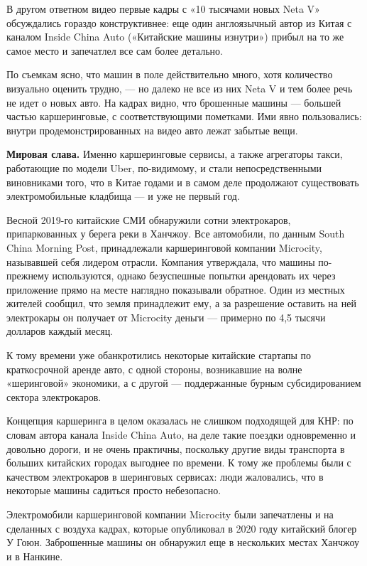 В другом ответном видео первые кадры с «10 тысячами новых Neta V» обсуждались гораздо конструктивнее: еще один англоязычный автор из Китая с каналом Inside China Auto («Китайские машины изнутри») прибыл на то же самое место и запечатлел все сам более детально.

По съемкам ясно, что машин в поле действительно много, хотя количество визуально оценить трудно, — но далеко не все из них Neta V и тем более речь не идет о новых авто. На кадрах видно, что брошенные машины — большей частью каршеринговые, с соответствующими пометками. Ими явно пользовались: внутри продемонстрированных на видео авто лежат забытые вещи.

\textbf{Мировая слава.} Именно каршеринговые сервисы, а также агрегаторы такси, работающие по модели Uber, по-видимому, и стали непосредственными виновниками того, что в Китае годами и в самом деле продолжают существовать электромобильные кладбища — и уже не первый год.

Весной 2019-го китайские СМИ обнаружили сотни электрокаров, припаркованных у берега реки в Ханчжоу. Все автомобили, по данным South China Morning Post, принадлежали каршеринговой компании Microcity, называвшей себя лидером отрасли. Компания утверждала, что машины по-прежнему используются, однако безуспешные попытки арендовать их через приложение прямо на месте наглядно показывали обратное. Один из местных жителей сообщил, что земля принадлежит ему, а за разрешение оставить на ней электрокары он получает от Microcity деньги — примерно по 4,5 тысячи долларов каждый месяц.

К тому времени уже обанкротились некоторые китайские стартапы по краткосрочной аренде авто, с одной стороны, возникавшие на волне «шеринговой» экономики, а с другой — поддержанные бурным субсидированием сектора электрокаров.

Концепция каршеринга в целом оказалась не слишком подходящей для КНР: по словам автора канала Inside China Auto, на деле такие поездки одновременно и довольно дороги, и не очень практичны, поскольку другие виды транспорта в больших китайских городах выгоднее по времени.
К тому же проблемы были с качеством электрокаров в шеринговых сервисах: люди жаловались, что в некоторые машины садиться просто небезопасно.

Электромобили каршеринговой компании Microcity были запечатлены и на сделанных с воздуха кадрах, которые опубликовал в 2020 году китайский блогер У Гоюн. Заброшенные машины он обнаружил еще в нескольких местах Ханчжоу и в Нанкине.


